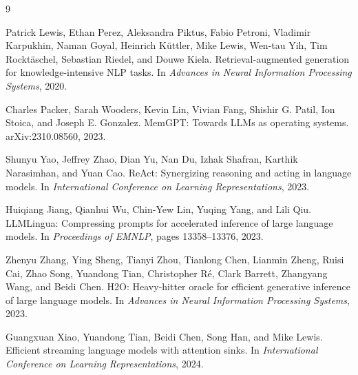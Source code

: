 \documentclass[10pt]{article}
\begin{document}
\begin{thebibliography}{9}

Patrick Lewis, Ethan Perez, Aleksandra Piktus, Fabio Petroni, Vladimir Karpukhin, Naman Goyal, Heinrich K\"uttler, Mike Lewis, Wen-tau Yih, Tim Rockt\"aschel, Sebastian Riedel, and Douwe Kiela.
\newblock Retrieval-augmented generation for knowledge-intensive NLP tasks.
\newblock In \emph{Advances in Neural Information Processing Systems}, 2020.

Charles Packer, Sarah Wooders, Kevin Lin, Vivian Fang, Shishir G. Patil, Ion Stoica, and Joseph E. Gonzalez.
\newblock MemGPT: Towards LLMs as operating systems.
\newblock arXiv:2310.08560, 2023.

Shunyu Yao, Jeffrey Zhao, Dian Yu, Nan Du, Izhak Shafran, Karthik Narasimhan, and Yuan Cao.
\newblock ReAct: Synergizing reasoning and acting in language models.
\newblock In \emph{International Conference on Learning Representations}, 2023.

Huiqiang Jiang, Qianhui Wu, Chin-Yew Lin, Yuqing Yang, and Lili Qiu.
\newblock LLMLingua: Compressing prompts for accelerated inference of large language models.
\newblock In \emph{Proceedings of EMNLP}, pages 13358--13376, 2023.

Zhenyu Zhang, Ying Sheng, Tianyi Zhou, Tianlong Chen, Lianmin Zheng, Ruisi Cai, Zhao Song, Yuandong Tian, Christopher R\'e, Clark Barrett, Zhangyang Wang, and Beidi Chen.
\newblock H2O: Heavy-hitter oracle for efficient generative inference of large language models.
\newblock In \emph{Advances in Neural Information Processing Systems}, 2023.

Guangxuan Xiao, Yuandong Tian, Beidi Chen, Song Han, and Mike Lewis.
\newblock Efficient streaming language models with attention sinks.
\newblock In \emph{International Conference on Learning Representations}, 2024.

\end{thebibliography}
\end{document}
